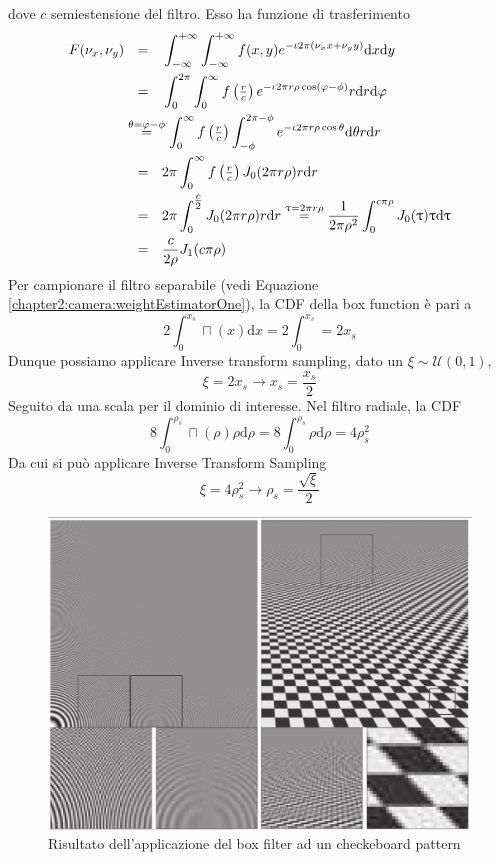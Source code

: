 dove $c$ semiestensione del filtro. Esso ha funzione di trasferimento
{
	\newcommand{\eq}{\stackrel{\small{\theta=\varphi-\phi}}{=}}
	\newcommand{\eqa}{\mathmakebox[\widthof{x=x-x}]{=}}
\begin{align}
	F(\nu_x,\nu_y)&\eqa\intwhole\intwhole f(x,y)e^{-\iota 2\pi(\nu_xx + \nu_yy)}\mathrm{d}x\mathrm{d}y \nonumber\\
	&\eqa\int_0^{2\pi}\int_0^{\infty}f\left(\tfrac{r}{c}\right)e^{-\iota 2\pi r \rho\cos(\varphi-\phi)}r\mathrm{d}r\mathrm{d}\varphi\nonumber\\
	&\eq\int_0^{\infty}f\left(\tfrac{r}{c}\right)\int_{-\phi}^{2\pi-\phi}e^{-\iota 2\pi r\rho\cos\theta}\mathrm{d}\theta r\mathrm{d}r\nonumber\\
	&\eqa2\pi\int_0^{\infty}f\left(\tfrac{r}{c}\right)J_0(2\pi r\rho)r\mathrm{d}r\nonumber \\
	&\eqa 2\pi\int_0^{\tfrac{c}{2}}J_0(2\pi r\rho)r\mathrm{d}r\stackrel{\uptau=2\pi r\rho}{=}\frac{1}{2\pi\rho^2}\int_0^{c\pi\rho}
		J_0(\uptau)\uptau\mathrm{d}\uptau\nonumber\\
	&\eqa\frac{c}{2\rho}J_1(c\pi\rho)
\end{align}
}
Per campionare il filtro separabile (vedi Equazione \ref{chapter2:camera:weightEstimatorOne}), la CDF della box function \`e pari a 
\begin{equation}
	2\int_0^{x_s}\sqcap(x)\mathrm{d}x=2\int_0^{x_s}=2x_s
\end{equation}
Dunque possiamo applicare Inverse transform sampling, dato un $\xi\sim\mathcal{U}(0,1)$, 
\begin{equation}
	\xi=2x_s\longrightarrow x_s=\frac{x_s}{2}
\end{equation}
Seguito da una scala per il dominio di interesse. Nel filtro radiale, la CDF
\begin{equation}
	8\int_0^{\rho_s}\sqcap(\rho)\rho\mathrm{d}\rho=8\int_0^{\rho_s}\rho\mathrm{d}\rho=4\rho_s^2
\end{equation}
Da cui si pu\`o applicare Inverse Transform Sampling
\begin{equation}
	\xi=4\rho_s^2\longrightarrow\rho_s=\frac{\sqrt{\xi}}{2}
\end{equation}
\begin{figure}[tb]
	\centering
	\includegraphics[width=.8\linewidth]{../assets/chapter5_reconstruction_box_result.png}
	\caption{Risultato dell'applicazione del box filter ad un checkeboard pattern}
	\label{chapter5:reconstruction:boxFilterResult}
\end{figure}
